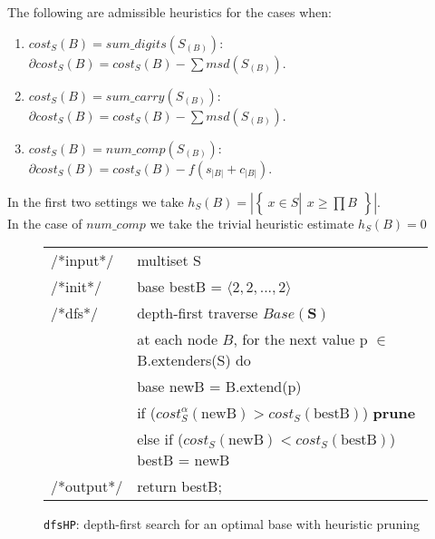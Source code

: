 \documentclass[envcountsame]{llncs}
\newcommand\tuple[1]{\langle #1 \rangle}
\newcommand{\Base}{\mathit{Base}}
\newcommand{\sumCarry}{\mathit{sum\_carry}}
\newcommand{\sumDigits}{\mathit{sum\_digits}}
\newcommand{\numComparators}{\mathit{num\_comp}}
\newcommand{\cost}{\mathit{cost}}
\newenvironment{SProg2}
     {\begin{small}\begin{tt}\begin{tabular}[c]{ll}}{\end{tabular}\end{tt}\end{small}}
\newcommand{\qin}{\hspace*{0.15in}}
\newcommand{\sset}[2]{\left\{~#1  \left|
      \begin{array}{l}#2\end{array}
    \right.     \right\}}
\begin{document}
\begin{lemma}
\label{lem:h}
  The following are
    admissible heuristics for the cases when: 
  \begin{enumerate}
  \item $\cost_S(B)=\sumDigits(S_{(B)})$:~~
$\partial \cost_S(B) = \cost_S(B)-\sum msd(S_{(B)})$.
  \item $\cost_S(B)=\sumCarry(S_{(B)})$:~~
$\partial \cost_S(B) = \cost_S(B)-\sum msd(S_{(B)})$.

  \item $\cost_S(B)=\numComparators(S_{(B)})$:~~
   $ \partial \cost_S(B) = \cost_S(B)- f(s_{|B|}+c_{|B|})$.
\end{enumerate}
In the first two settings we take   
$h_S(B) = \left| \sset{x \in S}{ x \geq \prod B} \right|$. \\
In the case of $\numComparators$ we take the  trivial heuristic estimate
$h_S(B)=0$
\end{lemma}




\begin{figure}[t]
\begin{SProg2}  
  {\scriptsize /*input*/} &multiset S\\
  {\scriptsize /*init*/}  &  base  bestB = $\tuple{2,2,...,2}$ \\
{\scriptsize /*dfs*/} & depth-first traverse $\mathbf{\Base(S)}$\\
                        & at each node $B$, 
                          for the next value  p $\in$ B.extenders(S) do\\
             &\qin\qin base newB = B.extend(p)\\
             &\qin\qin if ($\cost^\alpha_S(\mbox{newB})
                               > \cost_S(\mbox{bestB})$) \textbf{prune}\\
             &\qin\qin  else if ($\cost_S(\mbox{newB})<
                                              \cost_S(\mbox{bestB})$) 
                                           bestB = newB \\                  
   {\scriptsize /*output*/} & return bestB;\\
\end{SProg2}
\caption{\texttt{dfsHP}: depth-first search for an
  optimal base with heuristic pruning}
\label{fig:alg1}
\vspace{-3ex}
\end{figure}
\end{document}
